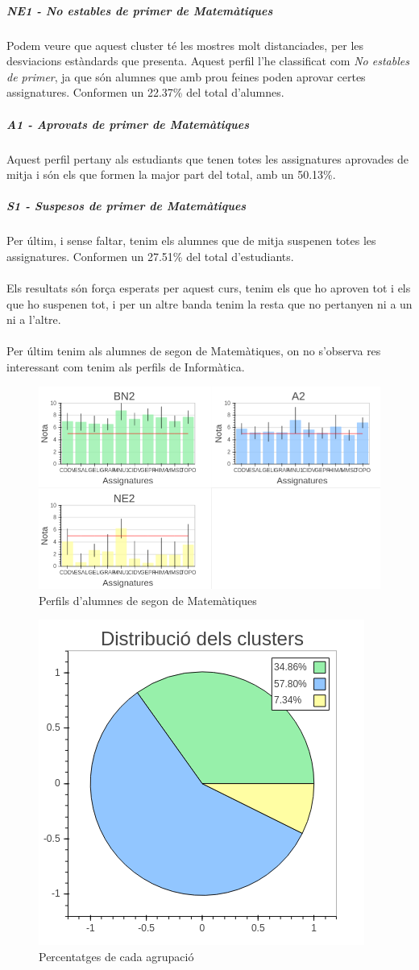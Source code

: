 \documentclass[12pt,a4paper,catalan]{article}
\begin{document}
\subparagraph{NE1 - No estables de primer de Matemàtiques}
Podem veure que aquest cluster té les mostres molt distanciades, per les desviacions estàndards que presenta. Aquest perfil l'he classificat com \textit{No estables de primer}, ja que són alumnes que amb prou feines poden aprovar certes assignatures. Conformen un 22.37\% del total d'alumnes.

\subparagraph{A1 - Aprovats de primer de Matemàtiques}
Aquest perfil pertany als estudiants que tenen totes les assignatures aprovades  de mitja i són els que formen la major part del total, amb un 50.13\%.

\subparagraph{S1 - Suspesos de primer de Matemàtiques}
Per últim, i sense faltar, tenim els alumnes que de mitja suspenen totes les assignatures. Conformen un 27.51\% del total d'estudiants.
\\
\\
Els resultats són força esperats per aquest curs, tenim els que ho aproven tot i els que ho suspenen tot, i per un altre banda tenim la resta que no pertanyen ni a un ni a l'altre.
\\
\\
Per últim tenim als alumnes de segon de Matemàtiques, on no s'observa res interessant com tenim als perfils de Informàtica.

\begin{figure}[h]
\centering
\includegraphics[width=.85\linewidth]{img/perfils_segon_mates.png}
\caption{Perfils d'alumnes de segon de Matemàtiques}
\end{figure}

\begin{figure}[h]
\centering
\includegraphics[width=.4\linewidth]{img/perfils_segon_mates_pastilla.png}
\caption{Percentatges de cada agrupació}
\end{figure}
\end{document}
